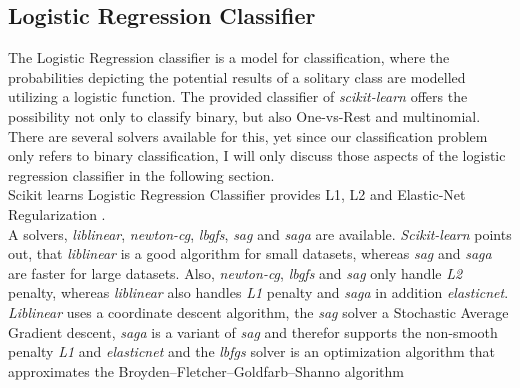 \documentclass[a4paper, 11pt,titlepage,oneside,openany]{book}
\begin{document}
\subsection{Logistic Regression Classifier}
The Logistic Regression classifier is a model for classification, where the probabilities depicting the potential results of a solitary class are modelled utilizing a logistic function. The provided classifier of \textit{scikit-learn} offers the possibility not only to classify binary, but also One-vs-Rest and multinomial. There are several solvers available for this, yet since our classification problem only refers to binary classification, I will only discuss those aspects of the logistic regression classifier in the following section. \\
\noindent Scikit learns Logistic Regression Classifier provides L1, L2 and Elastic-Net Regularization \cite{logisticregression}.\\
\noindent A solvers, \textit{liblinear}, \textit{newton-cg}, \textit{lbgfs}, \textit{sag} and \textit{saga} are available. \textit{Scikit-learn} points out, that \textit{liblinear} is a good algorithm for small datasets, whereas \textit{sag} and \textit{saga} are faster for large datasets. Also, \textit{newton-cg}, \textit{lbgfs} and \textit{sag} only handle \textit{L2} penalty, whereas \textit{liblinear} also handles \textit{L1} penalty and \textit{saga} in addition \textit{elasticnet}. \\
\noindent \textit{Liblinear} uses a coordinate descent algorithm, the \textit{sag} solver a Stochastic Average Gradient descent, \textit{saga} is a variant of \textit{sag} and therefor supports the non-smooth penalty \textit{L1} and \textit{elasticnet} and the \textit{lbfgs} solver is an optimization algorithm that approximates the Broyden–Fletcher–Goldfarb–Shanno algorithm
\end{document}
